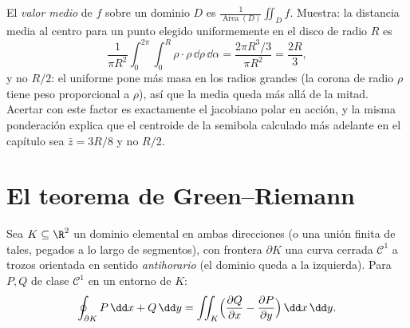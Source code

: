 \begin{example}\label{ex:b2:multint:average}
El \emph{valor medio} de $f$ sobre un dominio $D$ es
$\frac1{\operatorname{Area}(D)}\iint_Df$. Muestra: la distancia media
al centro para un punto elegido uniformemente en el disco de radio
$R$ es
\[
\frac{1}{\pi R^2}\int_0^{2\pi}\!\!\int_0^R
\rho\cdot\rho\,\dd\rho\,\dd\alpha
= \frac{2\pi R^3/3}{\pi R^2} = \frac{2R}3 ,
\]
y no $R/2$: el  uniforme pone más masa en los radios grandes (la
corona de radio $\rho$ tiene peso proporcional a $\rho$), así que la
media queda más allá de la mitad. Acertar con este factor es
exactamente el jacobiano polar en acción, y la misma ponderación
explica que el centroide de la semibola calculado más adelante en el
capítulo sea $\bar z = 3R/8$ y no $R/2$.
\end{example}

\section{El teorema de Green--Riemann}

\begin{theorem}\label{thm:b2:multint:green}
Sea $K \subseteq \R^2$ un dominio  elemental en ambas
direcciones (o una unión finita de tales, pegados a lo largo de
segmentos), con frontera $\partial K$ una curva cerrada
$\mathcal{C}^1$ a trozos orientada en sentido \emph{antihorario} (el
dominio queda a la izquierda). Para $P, Q$ de clase $\mathcal{C}^1$
en un entorno de $K$:
\[
\oint_{\partial K} P\,\dd x + Q\,\dd y
= \iint_K \Bigl(\frac{\partial Q}{\partial x}
- \frac{\partial P}{\partial y}\Bigr)\,\dd x\,\dd y .
\]
\end{theorem}

